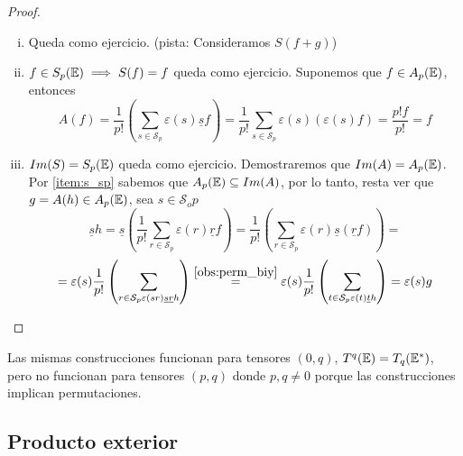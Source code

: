 \begin{proof}
    \begin{enumerate}[i)]
        \item Queda como ejercicio. (pista: Consideramos $S(f+g)$)
        \item $f \in S_p(\mathbb{E}) \implies S(f) = f$ queda como ejercicio.
        Suponemos que $f \in A_p(\mathbb{E})$, entonces
        \[
            A(f) = \frac{1}{p!} \left(\sum_{s \in \mathcal{S}_p} \varepsilon(s)\underline{s}f \right)
            = \frac{1}{p!}\sum_{s \in \mathcal{S}_p} \varepsilon(s) \left( \varepsilon(s)f \right) =
            \frac{p!f}{p!} = f
        \]
        \item $Im(S)=S_p(\mathbb{E})$ queda como ejercicio. Demostraremos que $Im(A)=A_p(\mathbb{E})$.
        Por \ref{item:s_sp} sabemos que $A_p(\mathbb{E}) \subseteq Im(A)$, por lo tanto, resta
        ver que $g=A(h)\in A_p(\mathbb{E})$, sea $s \in \mathcal{S}_op$
        \[
            \underline{s}h = \underline{s}\left( \frac{1}{p!}\sum_{r \in \mathcal{S}_p} \varepsilon(r)\underline{r}f
            \right) = \frac{1}{p!}\left(\sum_{r \in \mathcal{S}_p} \varepsilon(r)\underline{s}(\underline{r}f)\right) =
        \]
        \[
            = \varepsilon(s)\frac{1}{p!} \left( \sum_{r \in \mathcal{S}_p \varepsilon(sr) \underline{sr}h} \right)
            \stackrel{\ref{obs:perm_biy}}{=} \varepsilon(s)\frac{1}{p!} \left( \sum_{t \in \mathcal{S}_p \varepsilon(t)
            \underline{t}h} \right) = \varepsilon(s)g
        \]
    \end{enumerate}
\end{proof}
\begin{obs}
	Las mismas construcciones funcionan para tensores $(0,q)$, $T^q(\mathbb{E}) = T_q(\mathbb{E}^*)$, pero no funcionan para
	tensores $(p,q)$ donde $p,q \neq 0$ porque las construcciones implican permutaciones.
\end{obs}

\subsection{Producto exterior}

